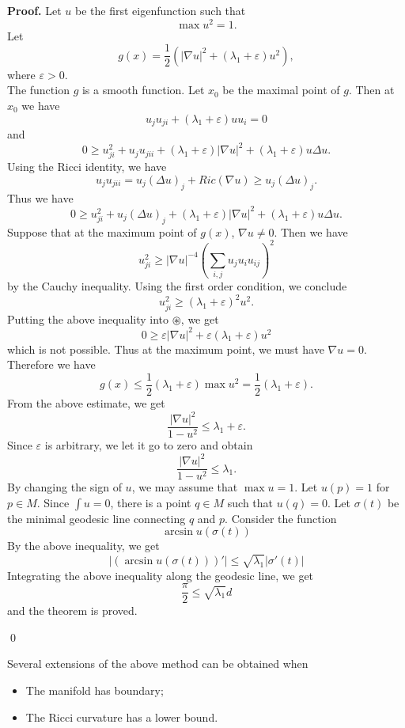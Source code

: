 {\bf Proof.}
Let $u$ be the first eigenfunction such that
\[
\max u^2 = 1.
\]
Let
\[
g(x) = \frac{1}{2}(|\nabla u|^2 + (\lambda_1 + \varepsilon)u^2),
\]
where $\varepsilon > 0$.
\\

The function $g$ is a smooth function. Let $x_0$ be the maximal point of $g$. 
Then at $x_0$ we have
\begin{equation}\label{1-1}
u_j u_{ji} + (\lambda_1 + \varepsilon) u u_i = 0
\end{equation}
and
\[
0 \geqslant u_{ji}^2 + u_j u_{jii} + (\lambda_1 + \varepsilon)
|\nabla u|^2 + (\lambda_1 + \varepsilon)u\Delta u.
\]
Using the Ricci identity, we have
\[
u_j u_{jii} = u_j(\Delta u)_j + Ric(\nabla u) \geqslant u_j(\Delta u)_j.
\]
Thus we have
\begin{equation}\label{2-1}
0 \geqslant u_{ji}^2 + u_j(\Delta u)_j + (\lambda_1 + \varepsilon)
|\nabla u|^2 + (\lambda_1 + \varepsilon)u\Delta u.
\end{equation}
Suppose that  at the maximum point of $g(x)$, $\nabla u \neq 0$. Then we have
\[
u_{ji}^2 \geqslant |\nabla u|^{-4}(\sum_{i,j}u_j u_i u_{ij})^2
\]
by the Cauchy inequality. Using the first order condition, we conclude
\[
u_{ji}^2 \geqslant (\lambda_1 + \varepsilon)^2 u^2.
\]
Putting the above inequality into $\circledast$, we get
\[
0 \geqslant \varepsilon|\nabla u|^2 + \varepsilon(\lambda_1 + \varepsilon)u^2
\]
which is not possible. Thus at the maximum point, we must have $\nabla u = 0$.
Therefore we have
\[
g(x) \leqslant \frac{1}{2}(\lambda_1 + \varepsilon)\max u^2 = \frac{1}{2}
(\lambda_1 + \varepsilon).
\]
From the above estimate, we get
\[
\frac{|\nabla u|^2}{1-u^2} \leqslant \lambda_1 + \varepsilon.
\]
Since $\varepsilon$ is arbitrary, we let it go to zero and obtain
\[
\frac{|\nabla u|^2}{1 - u^2} \leqslant \lambda_1.
\]
By changing the sign of $u$, we may assume that $\max u = 1$. Let $u(p) = 1$ for
$p\in M$. Since $\int u = 0$, there is a point $q\in M$ such that $u(q)=0$. Let
$\sigma(t)$ be the minimal geodesic line connecting $q$ and $p$. Consider the
function
\[
\arcsin u(\sigma(t))
\]
By the above inequality, we get
\[
|(\arcsin u(\sigma(t)))'| \leqslant \sqrt{\lambda_1}|\sigma '(t)|
\]
Integrating the above inequality along the geodesic line, we get
\[
\frac{\pi}{2} \leqslant \sqrt{\lambda_1}d
\]
and the theorem is proved.


\qed

Several extensions of the above method can be obtained when
\begin{itemize}
\item[\ding{172}] The manifold has boundary;
\item[\ding{173}] The Ricci curvature has a lower bound.
\end{itemize}

